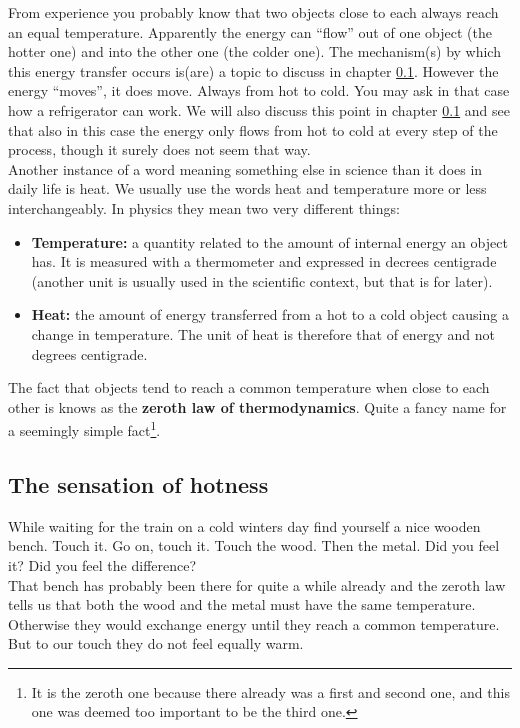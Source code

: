 \noindent From experience you probably know that two objects close to each always reach an equal temperature. Apparently the energy can "`flow"' out of one object (the hotter one) and into the other one (the colder one). The mechanism(s) by which this energy transfer occurs is(are) a topic to discuss in chapter \ref{}. However the energy "`moves"', it does move. Always from hot to cold. You may ask in that case how a refrigerator can work. We will also discuss this point in chapter \ref{} and see that also in this case the energy only flows from hot to cold at every step of the process, though it surely does not seem that way.\\

\noindent Another instance of a word meaning something else in science than it does in daily life is heat. We usually use the words heat and temperature more or less interchangeably. In physics they mean two very different things:
\begin{itemize}
\item \textbf{Temperature:} a quantity related to the amount of internal energy an object has. It is measured with a thermometer and expressed in decrees centigrade (another unit is usually used in the scientific context, but that is for later).
\item \textbf{Heat: }the amount of energy transferred from a hot to a cold object causing a change in temperature. The unit of heat is therefore that of energy and not degrees centigrade.
\end{itemize}

\noindent The fact that objects tend to reach a common temperature when close to each other is knows as the \textbf{zeroth law of thermodynamics}. Quite a fancy name for a seemingly simple fact\footnote{It is the zeroth one because there already was a first and second one, and this one was deemed too important to be the third one.}.

\subsection{The sensation of hotness}

\noindent While waiting for the train on a cold winters day find yourself a nice wooden bench. Touch it. Go on, touch it. Touch the wood. Then the metal. Did you feel it? Did you feel the difference?\\

\noindent That bench has probably been there for quite a while already and the zeroth law tells us that both the wood and the metal must have the same temperature. Otherwise they would exchange energy until they reach a common temperature. But to our touch they do not feel equally warm.\\

